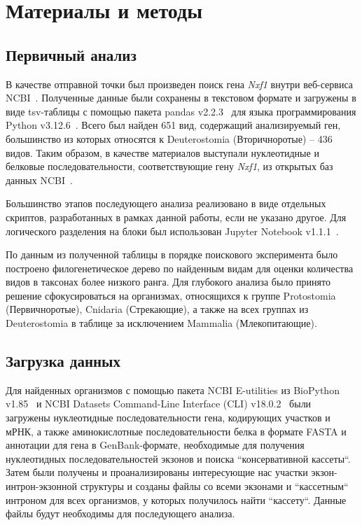 \newpage
\section{Материалы и методы}

\subsection{Первичный анализ}

В качестве отправной точки был произведен поиск гена \textit{Nxf1} внутри веб-сервиса NCBI~\cite{ncbi_general}.
Полученные данные были сохранены в текстовом формате и загружены в виде tsv-таблицы с помощью пакета pandas v2.2.3~\cite{pandas} для языка программирования Python v3.12.6~\cite{python_3_12}.
Всего был найден 651 вид, содержащий анализируемый ген, большинство из которых относятся к Deuterostomia (Вторичноротые) – 436 видов.
Таким образом, в качестве материалов выступали нуклеотидные и белковые последовательности, соответствующие гену \textit{Nxf1}, из открытых баз данных NCBI~\cite{ncbi_general}.

Большинство этапов последующего анализа реализовано в виде отдельных скриптов, разработанных в рамках данной работы, если не указано другое.
Для логического разделения на блоки был использован Jupyter Notebook v1.1.1~\cite{jupyter_notebook}.

По данным из полученной таблицы в порядке поискового эксперимента было построено филогенетическое дерево по найденным видам для оценки количества видов в таксонах более низкого ранга.
Для глубокого анализа было принято решение сфокусироваться на организмах, относящихся к группе Protostomia (Первичноротые), Cnidaria (Стрекающие), а также на всех группах из Deuterostomia в таблице за исключением Mammalia (Млекопитающие).

\subsection{Загрузка данных}

Для найденных организмов с помощью пакета NCBI E-utilities из BioPython v1.85~\cite{biopython} и NCBI Datasets Command-Line Interface (CLI) v18.0.2~\cite{datasets} были загружены нуклеотидные последовательности гена, кодирующих участков и мРНК, а также аминокислотные последовательности белка в формате FASTA и аннотации для гена в GenBank-формате, необходимые для получения нуклеотидных последовательностей экзонов и поиска ``консервативной кассеты``.
Затем были получены и проанализированы интересующие нас участки экзон-интрон-экзонной структуры и созданы файлы со всеми экзонами и ``кассетным`` интроном для всех организмов, у которых получилось найти ``кассету``.
Данные файлы будут необходимы для последующего анализа.


